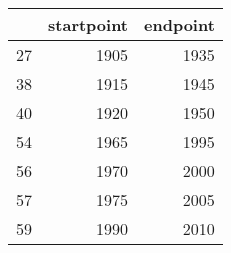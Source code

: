 % 
\begin{tabular}{rrr}
  \hline
 & startpoint & endpoint \\ 
  \hline
27 & 1905 & 1935 \\ 
  38 & 1915 & 1945 \\ 
  40 & 1920 & 1950 \\ 
  54 & 1965 & 1995 \\ 
  56 & 1970 & 2000 \\ 
  57 & 1975 & 2005 \\ 
  59 & 1990 & 2010 \\ 
   \hline
\end{tabular}
